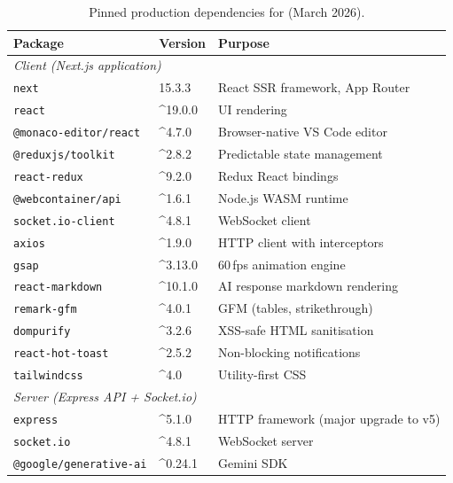 \begin{table}[H]
  \centering
  \caption{Pinned production dependencies for \echoray{} (March 2026).}
  \label{tab:deps}
  \renewcommand{\arraystretch}{1.05}
  \begin{tabular}{llp{6cm}}
    \toprule
    \textbf{Package} & \textbf{Version} & \textbf{Purpose} \\
    \midrule
    \multicolumn{3}{l}{\textit{Client (Next.js application)}} \\
    \midrule
    \texttt{next}                    & 15.3.3  & React SSR framework, App Router \\
    \texttt{react}                   & \^{}19.0.0 & UI rendering \\
    \texttt{@monaco-editor/react}    & \^{}4.7.0 & Browser-native VS Code editor \\
    \texttt{@reduxjs/toolkit}        & \^{}2.8.2 & Predictable state management \\
    \texttt{react-redux}             & \^{}9.2.0 & Redux React bindings \\
    \texttt{@webcontainer/api}       & \^{}1.6.1 & Node.js WASM runtime \\
    \texttt{socket.io-client}        & \^{}4.8.1 & WebSocket client \\
    \texttt{axios}                   & \^{}1.9.0 & HTTP client with interceptors \\
    \texttt{gsap}                    & \^{}3.13.0 & 60\,fps animation engine \\
    \texttt{react-markdown}          & \^{}10.1.0 & AI response markdown rendering \\
    \texttt{remark-gfm}              & \^{}4.0.1 & GFM (tables, strikethrough) \\
    \texttt{dompurify}               & \^{}3.2.6 & XSS-safe HTML sanitisation \\
    \texttt{react-hot-toast}         & \^{}2.5.2 & Non-blocking notifications \\
    \texttt{tailwindcss}             & \^{}4.0   & Utility-first CSS \\
    \midrule
    \multicolumn{3}{l}{\textit{Server (Express API + Socket.io)}} \\
    \midrule
    \texttt{express}                 & \^{}5.1.0  & HTTP framework (major upgrade to v5) \\
    \texttt{socket.io}               & \^{}4.8.1  & WebSocket server \\
    \texttt{@google/generative-ai}   & \^{}0.24.1 & Gemini SDK \\

\end{tabular}
\end{table}
